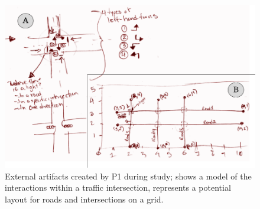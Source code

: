 \begin{figure}
\includegraphics[width=\columnwidth]{figures/P4sketches}
\caption{External artifacts created by P1 during study; \protect{} shows a model of the interactions within a traffic intersection, \protect{} represents a potential layout for roads and intersections on a grid.}
\label{P4Sketch}
\end{figure}


